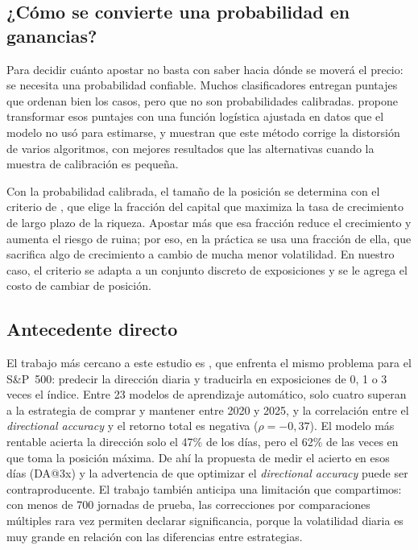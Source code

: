 \documentclass[11pt,a4paper]{article}
\begin{document}
\subsection{¿Cómo se convierte una probabilidad en ganancias?}

Para decidir cuánto apostar no basta con saber hacia dónde se moverá el precio: se necesita una probabilidad confiable. Muchos clasificadores entregan puntajes que ordenan bien los casos, pero que no son probabilidades calibradas. \citet{platt1999} propone transformar esos puntajes con una función logística ajustada en datos que el modelo no usó para estimarse, y \citet{niculescu2005} muestran que este método corrige la distorsión de varios algoritmos, con mejores resultados que las alternativas cuando la muestra de calibración es pequeña.

Con la probabilidad calibrada, el tamaño de la posición se determina con el criterio de \citet{kelly1956}, que elige la fracción del capital que maximiza la tasa de crecimiento de largo plazo de la riqueza. Apostar más que esa fracción reduce el crecimiento y aumenta el riesgo de ruina; por eso, en la práctica se usa una fracción de ella, que sacrifica algo de crecimiento a cambio de mucha menor volatilidad. En nuestro caso, el criterio se adapta a un conjunto discreto de exposiciones y se le agrega el costo de cambiar de posición.

\subsection{Antecedente directo}

El trabajo más cercano a este estudio es \citet{gonzalez2026}, que enfrenta el mismo problema para el S\&P~500: predecir la dirección diaria y traducirla en exposiciones de 0, 1 o 3 veces el índice. Entre 23 modelos de aprendizaje automático, solo cuatro superan a la estrategia de comprar y mantener entre 2020 y 2025, y la correlación entre el \emph{directional accuracy} y el retorno total es negativa ($\rho=-0{,}37$). El modelo más rentable acierta la dirección solo el 47\% de los días, pero el 62\% de las veces en que toma la posición máxima. De ahí la propuesta de medir el acierto en esos días (DA@3x) y la advertencia de que optimizar el \emph{directional accuracy} puede ser contraproducente. El trabajo también anticipa una limitación que compartimos: con menos de 700 jornadas de prueba, las correcciones por comparaciones múltiples rara vez permiten declarar significancia, porque la volatilidad diaria es muy grande en relación con las diferencias entre estrategias.
\end{document}
